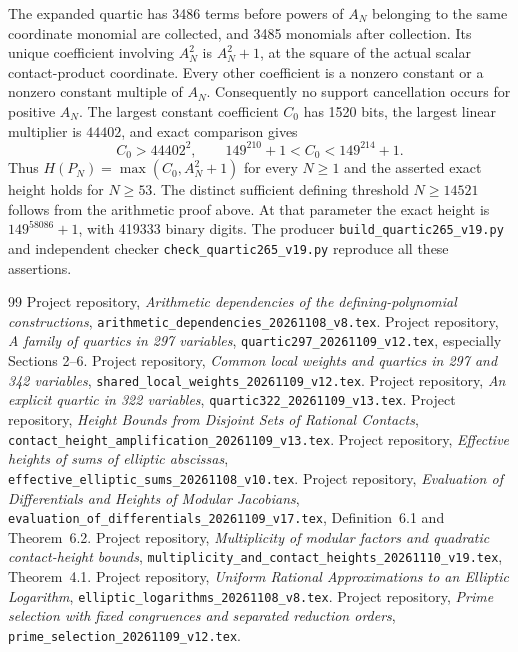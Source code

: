 \documentclass[11pt,a4paper]{article}
\begin{document}
The expanded quartic has 3486 terms before powers of $A_N$ belonging
to the same coordinate monomial are collected, and 3485 monomials
after collection. Its unique coefficient involving $A_N^2$ is
$A_N^2+1$, at the square of the actual scalar contact-product coordinate.
Every other coefficient is a nonzero constant or a nonzero constant
multiple of $A_N$. Consequently no support cancellation occurs for
positive $A_N$. The largest constant coefficient $C_0$ has 1520 bits,
the largest linear multiplier is $44402$, and exact comparison
gives
\[
 C_0>44402^2,\qquad
 149^{210}+1<C_0<149^{214}+1.
\]
Thus $H(P_N)=\max(C_0,A_N^2+1)$ for every $N\ge1$ and the asserted
exact height holds for $N\ge53$. The distinct sufficient defining threshold $N\ge14521$ follows from
the arithmetic proof above. At that parameter the exact height is
$149^{58086}+1$, with 419333 binary digits. The producer
\nolinkurl{build_quartic265_v19.py} and independent checker
\nolinkurl{check_quartic265_v19.py} reproduce all these assertions.

\begin{thebibliography}{99}\small\setlength{\itemsep}{2pt}
 Project repository,
\emph{Arithmetic dependencies of the defining-polynomial constructions},
\nolinkurl{arithmetic_dependencies_20261108_v8.tex}.
 Project repository,
\emph{A family of quartics in 297 variables},
\nolinkurl{quartic297_20261109_v12.tex}, especially Sections 2--6.
 Project repository,
\emph{Common local weights and quartics in 297 and 342 variables},
\nolinkurl{shared_local_weights_20261109_v12.tex}.
 Project repository,
\emph{An explicit quartic in 322 variables},
\nolinkurl{quartic322_20261109_v13.tex}.
 Project repository,
\emph{Height Bounds from Disjoint Sets of Rational Contacts},
\nolinkurl{contact_height_amplification_20261109_v13.tex}.
 Project repository,
\emph{Effective heights of sums of elliptic abscissas},
\nolinkurl{effective_elliptic_sums_20261108_v10.tex}.
 Project repository,
\emph{Evaluation of Differentials and Heights of Modular Jacobians},
\nolinkurl{evaluation_of_differentials_20261109_v17.tex},
Definition~6.1 and Theorem~6.2.
 Project repository,
\emph{Multiplicity of modular factors and quadratic contact-height bounds},
\nolinkurl{multiplicity_and_contact_heights_20261110_v19.tex},
Theorem~4.1.
 Project repository,
\emph{Uniform Rational Approximations to an Elliptic Logarithm},
\nolinkurl{elliptic_logarithms_20261108_v8.tex}.
 Project repository,
\emph{Prime selection with fixed congruences and separated reduction orders},
\nolinkurl{prime_selection_20261109_v12.tex}.
\end{thebibliography}
\end{document}

